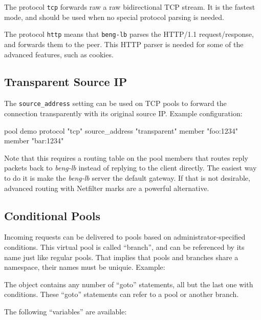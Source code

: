 \documentclass[a4paper,12pt]{article}
\begin{document}
The protocol \texttt{tcp} forwards raw a raw bidirectional TCP stream.
It is the fastest mode, and should be used when no special protocol
parsing is needed.

The protocol \texttt{http} means that \texttt{beng-lb} parses the
HTTP/1.1 request/response, and forwards them to the peer.  This HTTP
parser is needed for some of the advanced features, such as cookies.

\subsection{Transparent Source IP}

The \verb|source_address| setting can be used on TCP pools to forward
the connection transparently with its original source IP.  Example
configuration:

\begin{verbatim*}
pool demo {
  protocol "tcp"
  source_address "transparent"
  member "foo:1234"
  member "bar:1234"
}
\end{verbatim*}

Note that this requires a routing table on the pool members that
routes reply packets back to \emph{beng-lb} instead of replying to the
client directly.  The easiest way to do it is make the \emph{beng-lb}
server the default gateway.  If that is not desirable, advanced
routing with Netfilter marks are a powerful alternative.

\subsection{Conditional Pools}

Incoming requests can be delivered to pools based on
administrator-specified conditions.  This virtual pool is called
``branch'', and can be referenced by its name just like regular pools.
That implies that pools and branches share a namespace, their names
must be uniquie.  Example:


The object contains any number of ``goto'' statements, all but the
last one with conditions.  These ``goto'' statements can refer to a
pool or another branch.

The following ``variables'' are available:
\end{document}
